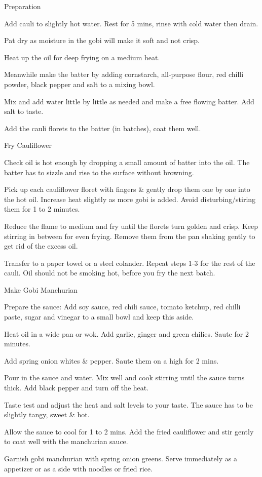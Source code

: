 \begin{method}
Preparation

Add cauli to slightly hot water. Rest for 5 mins, rinse with cold water then
drain.

Pat dry as moisture in the gobi will make it soft and not crisp. 

Heat up the oil for deep frying on a medium heat. 

Meanwhile make the batter by adding cornstarch, all-purpose flour, red
chilli powder, black pepper and salt to a mixing bowl.

Mix and add water little by little as needed and make a free flowing
batter. Add salt to taste.

Add the cauli florets to the batter (in batches), coat them well.
 
Fry Cauliflower

Check oil is hot enough by dropping a small amount of batter into the oil.
The batter has to sizzle and rise to the surface without browning.

Pick up each cauliflower floret with fingers \& gently drop them one by
one into the hot oil. Increase heat slightly as more gobi is added. Avoid
disturbing/stiring them for 1 to 2 minutes. 

Reduce the flame to medium and fry until the florets turn golden and
crisp. Keep stirring in between for even frying. Remove them from the
pan shaking gently to get rid of the excess oil. 

Transfer to a paper towel or a steel colander. Repeat steps 1-3 for the rest
of the cauli. Oil should not be smoking hot, before you fry the next batch. 

Make Gobi Manchurian

Prepare the sauce: Add soy sauce, red chili sauce, tomato ketchup, red
chilli paste, sugar and vinegar to a small bowl and keep this aside. 

Heat oil in a wide pan or wok. Add garlic, ginger and green chilies. Saute
for 2 minutes.

Add spring onion whites \& pepper. Saute them on a high for 2 mins.

Pour in the sauce and water. Mix well and cook stirring until the sauce
turns thick. Add black pepper and turn off the heat. 

Taste test and adjust the heat and salt levels to your taste. The sauce has
to be slightly tangy, sweet \& hot.

Allow the sauce to cool for 1 to 2 mins. Add the fried cauliflower and stir
gently to coat well with the manchurian sauce. 

Garnish gobi manchurian with spring onion greens. Serve immediately as
a appetizer or as a side with noodles or fried rice.
  
\end{method}







